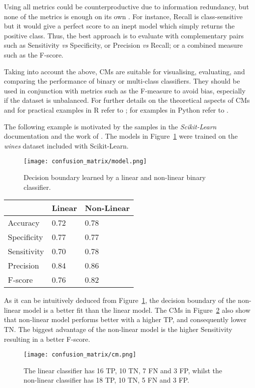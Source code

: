 Using all metrics could be counterproductive due to information redundancy, but none of the metrics is enough on its own \citep{ma2007adequate}. For instance, Recall is class-sensitive but it would give a perfect score to an inept model which simply returns the positive class. Thus, the best approach is to evaluate with complementary pairs \citep{gu2009evaluation} such as Sensitivity \textit{vs} Specificity, or Precision \textit{vs} Recall; or a combined measure such as the F-score.

Taking into account the above, CMs are suitable for visualising, evaluating, and comparing the performance of binary or multi-class classifiers. They should be used in conjunction with metrics such as the F-measure to avoid bias, especially if the dataset is unbalanced. For further details on the theoretical aspects of CMs and for practical examples in R refer to \citep{cichosz2014data}; for examples in Python refer to \citep{muller2016introduction}.

The following example is motivated by the samples in the \textit{Scikit-Learn} documentation and the work of  \citep{geron2017hands}. The models in Figure~\ref{fig:cm_model} were trained on the \textit{wines} dataset included with Scikit-Learn.

\begin{figure}
  \texttt{[image: confusion\_matrix/model.png]}
  \caption{Decision boundary learned by a linear and non-linear binary classifier.}
  \label{fig:cm_model}
\end{figure}

\begin{margintable}
  \begin{tabular}{lll}
    \toprule
                 & Linear & Non-Linear \\
    \midrule
    Accuracy     & 0.72   & 0.78 \\
    Specificity  & 0.77   & 0.77 \\
    Sensitivity  & 0.70   & 0.78 \\
    Precision    & 0.84   & 0.86 \\
    F-score      & 0.76   & 0.82 \\
    \bottomrule
  \end{tabular}
  \caption{Statistics derived from the CMs in Figure~\ref{fig:cm_wines}.}
  \label{tab:cm_metrics}
\end{margintable}

As it can be intuitively deduced from Figure~\ref{fig:cm_model}, the decision boundary of the non-linear model is a better fit than the linear model. The CMs in Figure~\ref{fig:cm_wines} also show that non-linear model performs better with a higher TP, and consequently lower TN. The biggest advantage of the non-linear model is the higher Sensitivity resulting in a better F-score.

\begin{figure}
  \texttt{[image: confusion\_matrix/cm.png]}
  \caption{The linear classifier has 16 TP, 10 TN, 7 FN and 3 FP, whilst the non-linear classifier has 18 TP, 10 TN, 5 FN and 3 FP.}
  \label{fig:cm_wines}
\end{figure}


